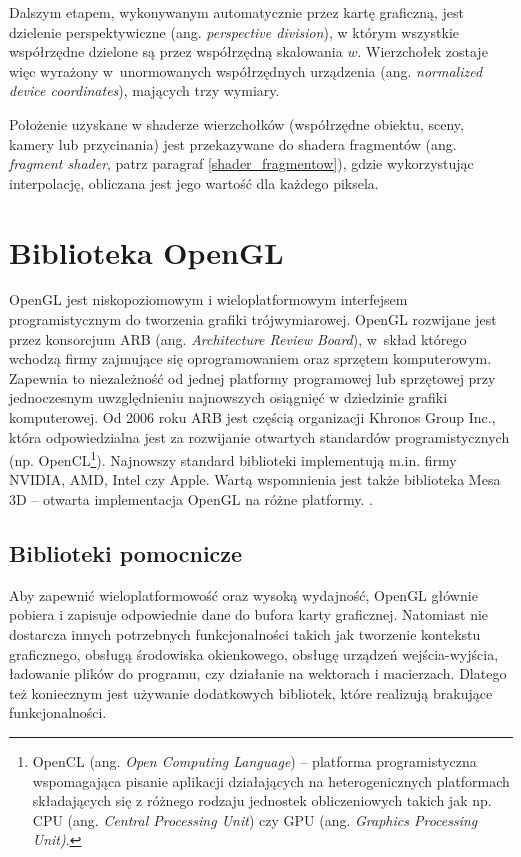 \documentclass[12pt, twoside, openany]{report}
\begin{document}
Dalszym etapem, wykonywanym automatycznie przez kartę graficzną, jest dzielenie perspektywiczne (ang. \textit{perspective division}), w którym wszystkie współrzędne dzielone są przez współrzędną skalowania $w$. Wierzchołek zostaje więc wyrażony w~unormowanych współrzędnych urządzenia (ang. \textit{normalized device coordinates}), mających trzy wymiary.

Położenie uzyskane w shaderze wierzchołków (współrzędne obiektu, sceny, kamery lub przycinania) jest przekazywane do shadera fragmentów (ang. \textit{fragment shader}, patrz paragraf \ref{shader_fragmentow}), gdzie wykorzystując interpolację, obliczana jest jego wartość dla każdego piksela.

\section{Biblioteka OpenGL}
\label{biblioteka_opengl}

OpenGL jest niskopoziomowym i wieloplatformowym interfejsem programistycznym do tworzenia grafiki trójwymiarowej. OpenGL rozwijane jest przez konsorcjum ARB (ang. \textit{Architecture Review Board}), w~skład którego wchodzą firmy zajmujące się oprogramowaniem oraz sprzętem komputerowym. Zapewnia to niezależność od jednej platformy programowej lub sprzętowej przy jednoczesnym uwzględnieniu najnowszych osiągnięć w dziedzinie grafiki komputerowej. Od 2006 roku ARB jest częścią organizacji Khronos Group Inc., która odpowiedzialna jest za rozwijanie otwartych standardów programistycznych (np. OpenCL\footnote{OpenCL (ang. \textit{Open Computing Language}) -- platforma programistyczna wspomagająca pisanie aplikacji działających na heterogenicznych platformach składających się z różnego rodzaju jednostek obliczeniowych takich jak np. CPU (ang. \textit{Central Processing Unit}) czy GPU (ang. \textit{Graphics Processing Unit)}.}). Najnowszy standard biblioteki implementują m.in. firmy NVIDIA, AMD, Intel czy Apple. Wartą wspomnienia jest także biblioteka Mesa 3D -- otwarta implementacja OpenGL na różne platformy. \cite{bib:ganczarski}.

\subsection{Biblioteki pomocnicze}
\label{biblioteki_pomocnicze}
Aby zapewnić wieloplatformowość oraz wysoką wydajność, OpenGL głównie pobiera i zapisuje odpowiednie dane do bufora karty graficznej. Natomiast nie dostarcza innych potrzebnych funkcjonalności takich jak tworzenie kontekstu graficznego, obsługą środowiska okienkowego, obsługę urządzeń wejścia-wyjścia, ładowanie plików do programu, czy działanie na wektorach i macierzach. Dlatego też koniecznym jest używanie dodatkowych bibliotek, które realizują brakujące funkcjonalności.
\end{document}
